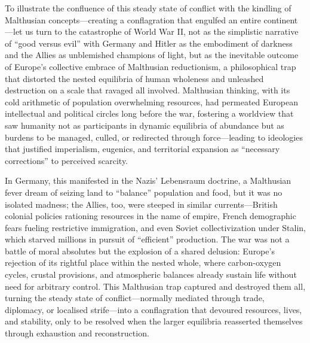 To illustrate the confluence of this steady state of conflict with the kindling of Malthusian concepts—creating a conflagration that engulfed an entire continent—let us turn to the catastrophe of World War II, not as the simplistic narrative of “good versus evil” with Germany and Hitler as the embodiment of darkness and the Allies as unblemished champions of light, but as the inevitable outcome of Europe’s collective embrace of Malthusian reductionism, a philosophical trap that distorted the nested equilibria of human wholeness and unleashed destruction on a scale that ravaged all involved. Malthusian thinking, with its cold arithmetic of population overwhelming resources, had permeated European intellectual and political circles long before the war, fostering a worldview that saw humanity not as participants in dynamic equilibria of abundance but as burdens to be managed, culled, or redirected through force—leading to ideologies that justified imperialism, eugenics, and territorial expansion as “necessary corrections” to perceived scarcity.

In Germany, this manifested in the Nazis’ Lebensraum doctrine, a Malthusian fever dream of seizing land to “balance” population and food, but it was no isolated madness; the Allies, too, were steeped in similar currents—British colonial policies rationing resources in the name of empire, French demographic fears fueling restrictive immigration, and even Soviet collectivization under Stalin, which starved millions in pursuit of “efficient” production. The war was not a battle of moral absolutes but the explosion of a shared delusion: Europe’s rejection of its rightful place within the nested whole, where carbon-oxygen cycles, crustal provisions, and atmospheric balances already sustain life without need for arbitrary control. This Malthusian trap captured and destroyed them all, turning the steady state of conflict—normally mediated through trade, diplomacy, or localised strife—into a conflagration that devoured resources, lives, and stability, only to be resolved when the larger equilibria reasserted themselves through exhaustion and reconstruction.

